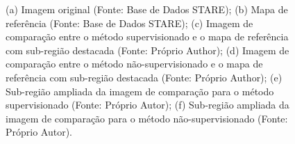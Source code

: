 \begin{figure}[!h]
    \caption{(a) Imagem original (Fonte: Base de Dados STARE); (b) Mapa de refer\^{e}ncia (Fonte: Base de Dados STARE); (c) Imagem de compara\c{c}\~{a}o entre o m\'{e}todo supervisionado e o mapa de refer\^{e}ncia com sub-regi\~{a}o destacada (Fonte: Pr\'{o}prio Author); (d) Imagem de compara\c{c}\~{a}o entre o m\'{e}todo n\~{a}o-supervisionado e o mapa de refer\^{e}ncia com sub-regi\~{a}o destacada (Fonte: Pr\'{o}prio Author); (e) Sub-regi\~{a}o ampliada da imagem de compara\c{c}\~{a}o para o m\'{e}todo supervisionado (Fonte: Pr\'{o}prio Autor); (f) Sub-regi\~{a}o ampliada da imagem de compara\c{c}\~{a}o para o m\'{e}todo n\~{a}o-supervisionado (Fonte: Pr\'{o}prio Autor).}
    \label{Fig:exemplesCOmp}
\end{figure}

